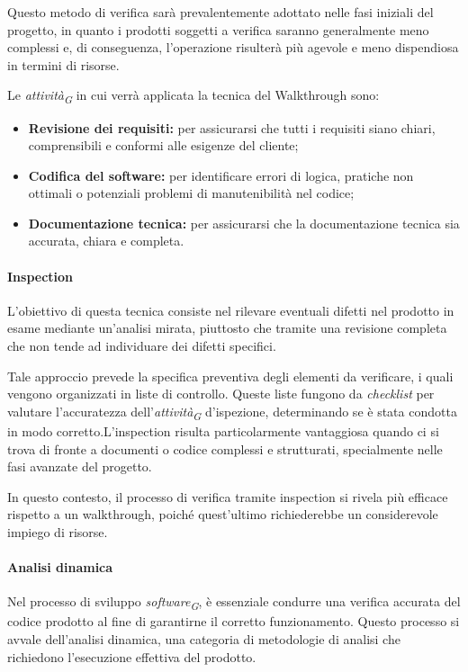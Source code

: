 Questo metodo di verifica sarà prevalentemente adottato nelle fasi iniziali del progetto, in quanto i prodotti soggetti a verifica saranno generalmente meno complessi e, di conseguenza, l'operazione risulterà più agevole e meno dispendiosa in termini di risorse.

Le \textit{attività}\textsubscript{\textit{G}} in cui verrà applicata la tecnica del Walkthrough sono:
\begin{itemize}
    \item \textbf{Revisione dei requisiti:} 
        per assicurarsi che tutti i requisiti siano chiari, comprensibili e conformi alle esigenze del cliente;
    \item \textbf{Codifica del software:} 
        per identificare errori di logica, pratiche non ottimali o potenziali problemi di manutenibilità nel codice;
    \item \textbf{Documentazione tecnica:} 
        per assicurarsi che la documentazione tecnica sia accurata, chiara e completa. 
\end{itemize}

\paragraph{Inspection}
L'obiettivo di questa tecnica consiste nel rilevare eventuali difetti nel prodotto in esame mediante un'analisi mirata, piuttosto che tramite una revisione completa che non tende ad individuare dei difetti specifici.

\vspace{0.2cm}

Tale approccio prevede la specifica preventiva degli elementi da verificare, i quali vengono organizzati in liste di controllo.
Queste liste fungono da \textit{checklist} per valutare l'accuratezza dell'\textit{attività}\textsubscript{\textit{G}} d'ispezione, determinando se è stata condotta in modo corretto.L'inspection risulta particolarmente vantaggiosa quando ci si trova di fronte a documenti o codice complessi e strutturati, specialmente nelle fasi avanzate del progetto.

In questo contesto, il processo di verifica tramite inspection si rivela più efficace rispetto a un walkthrough, poiché quest'ultimo richiederebbe un considerevole impiego di risorse.

\paragraph{Analisi dinamica}
Nel processo di sviluppo \textit{software}\textsubscript{\textit{G}}, è essenziale condurre una verifica accurata del codice prodotto al fine di garantirne il corretto funzionamento. Questo processo si avvale dell'analisi dinamica, una categoria di metodologie di analisi che richiedono l'esecuzione effettiva del prodotto.

